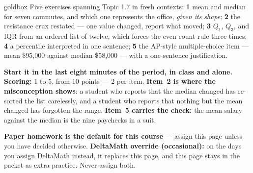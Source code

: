 \documentclass[10pt]{article}
\begin{document}
\boxguard
\begin{skillbox}{goldbox}
Five exercises spanning Topic 1.7 in fresh contexts: \textbf{1} mean and median for seven
commutes, and which one represents the office, \emph{given its shape}; \textbf{2} the resistance
crux restated --- one value changed, report what moved; \textbf{3} $Q_1$, $Q_3$, and IQR from an
ordered list of twelve, which forces the even-count rule three times; \textbf{4} a percentile
interpreted in one sentence; \textbf{5} the AP-style multiple-choice item --- mean \$95{,}000
against median \$58{,}000 --- with a one-sentence justification.

\textbf{Start it in the last eight minutes of the period, in class and alone.} \textbf{Scoring:}
1 to 5, from 10 points --- 2 per item. \textbf{Item~2 is where the misconception shows}: a student who
reports that the median changed has re-sorted the list carelessly, and a student who reports
that nothing but the mean changed has forgotten the range. \textbf{Item~5 carries the check:} the
mean salary against the median is the nine paychecks in a suit.

\textbf{Paper homework is the default for this course} --- assign this page unless you have
decided otherwise. \textbf{DeltaMath override (occasional):} on the days you assign DeltaMath
instead, it replaces this page, and this page
stays in the packet as extra practice. Never assign both.
\end{skillbox}
\end{document}
